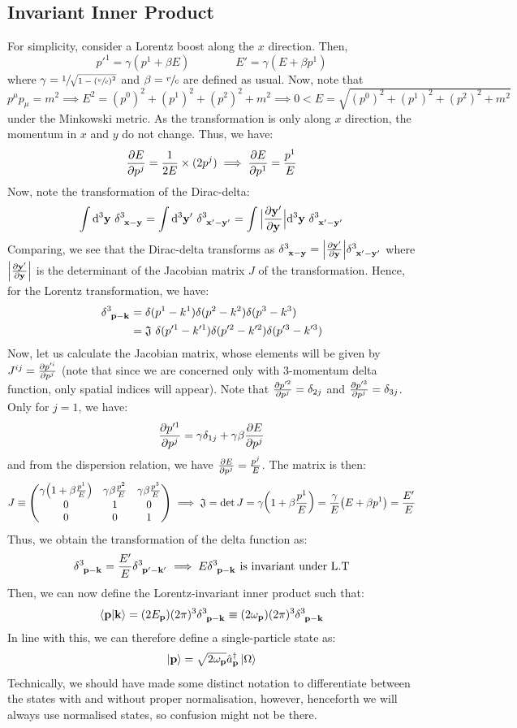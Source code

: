 \subsection{Invariant Inner Product}
For simplicity, consider a Lorentz boost along the $x$ direction. Then, 
$${p'}^1 = \gamma(p^1+\beta E)\qquad\qquad E' = \gamma(E+\beta p^1)$$
where $\gamma = \sfrac{1}{\sqrt{1-\qty(\sfrac{v}{c})^2}}$ and $\beta = \sfrac{v}{c}$ are defined as usual. Now, note that $p^\mu p_\mu = m^2 \implies E^2 = (p^0)^2 +(p^1)^2+(p^2)^2+m^2 \implies 0<E= \sqrt{(p^0)^2 +(p^1)^2+(p^2)^2+m^2}$ under the Minkowski metric. As the transformation is only along $x$ direction, the momentum in $x$ and $y$ do not change. Thus, we have:
$$\pdv{E}{p^j} = \frac{1}{2E}\times (2 p^j) \implies \pdv{E}{p^1} = \frac{p^1}{E}$$
Now, note the transformation of the Dirac-delta:
\begin{align*}
   \int \dd^3 \vb{y} \ \delt{3}{\vb{x}-\vb{y}} =  \int \dd^3 \vb{y}' \ \delt{3}{\vb{x}'-\vb{y}'} = \int \Big|\pdv{\vb{y}'}{\vb{y}}\Big| \dd^3 \vb{y} \ \delt{3}{\vb{x}'-\vb{y}'}
\end{align*}
Comparing, we see that the Dirac-delta transforms as $\delt{3}{\vb{x}-\vb{y}} = \Big|\pdv{\vb{y}'}{\vb{y}}\Big| \delt{3}{\vb{x}'-\vb{y}'}$ where $\Big|\pdv{\vb{y}'}{\vb{y}}\Big|$ is the determinant of the Jacobian matrix $J$ of the transformation. Hence, for the Lorentz transformation, we have:
\begin{align*}
   \delt{3}{\vb{p}-\vb{k}} &=  \delta(p^1-k^1) \delta(p^2-k^2) \delta(p^3-k^3)\\
   &= \mathfrak{J} \ \delta(p'^1-k'^1) \delta(p'^2-k'^2) \delta(p'^3-k'^3)
\end{align*}
Now, let us calculate the Jacobian matrix, whose elements will be given by $J^{ij} = \pdv{p'^i}{p^j}$ (note that since we are concerned only with 3-momentum delta function, only spatial indices will appear). Note that $\pdv{p'^2}{p^j} = \delta_{2j}$ and $\pdv{p'^3}{p^j} = \delta_{3j}$. Only for $j=1$, we have:
$$\pdv{p'^1}{p^j} = \gamma \delta_{1j} + \gamma\beta \pdv{E}{p^j}$$ and from the dispersion relation, we have $\pdv{E}{p^j} = \frac{p^j}{E}$. The matrix is then:
$$J \equiv \mqty(\gamma \qty(1+\beta \frac{p^1}{E}) & \gamma\beta \frac{p^2}{E} & \gamma\beta \frac{p^3}{E}\\ 0 & 1 & 0 \\ 0 & 0 & 1)\implies \mathfrak{J} =  \det J  = \gamma \qty(1+\beta \frac{p^1}{E}) = \frac{\gamma}{E} \qty(E+\beta p^1) = \frac{E'}{E}$$
Thus, we obtain the transformation of the delta function as:
$$   \delt{3}{\vb{p}-\vb{k}}= \frac{E'}{E}   \delt{3}{\vb{p}'-\vb{k}'}\implies E \delt{3}{\vb{p}-\vb{k}} \text{ is invariant under L.T} $$
Then, we can now define the Lorentz-invariant inner product such that:
$$\braket{\vb{p}|\vb{k}} =(2E_{\vb{p}}) (2\pi)^3 \delt{3}{\vb{p}-\vb{k}}\equiv (2\omp) (2\pi)^3 \delt{3}{\vb{p}-\vb{k}}$$
In line with this, we can therefore define a single-particle state as:
$$\ket{\vb{p}} = \sqrt{2\omega_{\vb{{p}}}} \hat{a}_{\vb{p}}^\dagger \ket{\Omega}$$
Technically, we should have made some distinct notation to differentiate between the states with and without proper normalisation, however, henceforth we will always use normalised states, so confusion might not be there. 
